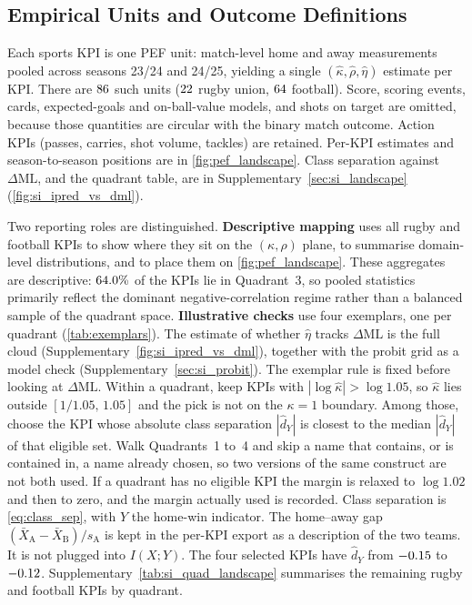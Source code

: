 \subsection{Empirical Units and Outcome Definitions}
\label{sec:outcome_defs}

Each sports KPI is one PEF unit: match-level home and away measurements pooled across seasons 23/24 and 24/25, yielding a single $(\hat\kappa,\hat\rho,\hat\eta)$ estimate per KPI. There are $86{}$ such units ($22{}$ rugby union, $64{}$ football). Score, scoring events, cards, expected-goals and on-ball-value models, and shots on target are omitted, because those quantities are circular with the binary match outcome. Action KPIs (passes, carries, shot volume, tackles) are retained. Per-KPI estimates and season-to-season positions are in \cref{fig:pef_landscape}. Class separation against $\Delta\mathrm{ML}$, and the quadrant table, are in Supplementary~\cref{sec:si_landscape} (\cref{fig:si_ipred_vs_dml}).

Two reporting roles are distinguished. \textbf{Descriptive mapping} uses all rugby and football KPIs to show where they sit on the $(\kappa,\rho)$ plane, to summarise domain-level distributions, and to place them on \cref{fig:pef_landscape}. These aggregates are descriptive: $64.0\%$ of the KPIs lie in Quadrant~3, so pooled statistics primarily reflect the dominant negative-correlation regime rather than a balanced sample of the quadrant space. \textbf{Illustrative checks} use four exemplars, one per quadrant (\cref{tab:exemplars}). The estimate of whether $\hat\eta$ tracks $\Delta\mathrm{ML}$ is the full cloud (Supplementary~\cref{fig:si_ipred_vs_dml}), together with the probit grid as a model check (Supplementary~\cref{sec:si_probit}). The exemplar rule is fixed before looking at $\Delta\mathrm{ML}$. Within a quadrant, keep KPIs with $|\log\hat\kappa|>\log 1.05$, so $\hat\kappa$ lies outside $[1/1.05,\,1.05]$ and the pick is not on the $\kappa=1$ boundary. Among those, choose the KPI whose absolute class separation $|\hat d_Y|$ is closest to the median $|\hat d_Y|$ of that eligible set. Walk Quadrants~1 to~4 and skip a name that contains, or is contained in, a name already chosen, so two versions of the same construct are not both used. If a quadrant has no eligible KPI the margin is relaxed to $\log 1.02$ and then to zero, and the margin actually used is recorded. Class separation is \cref{eq:class_sep}, with $Y$ the home-win indicator. The home--away gap $(\bar X_{\mathrm{A}}-\bar X_{\mathrm{B}})/s_{\mathrm{A}}$ is kept in the per-KPI export as a description of the two teams. It is not plugged into $I(X;Y)$. The four selected KPIs have $\hat d_Y$ from $-0.15$ to $-0.12$. Supplementary~\cref{tab:si_quad_landscape} summarises the remaining rugby and football KPIs by quadrant.

